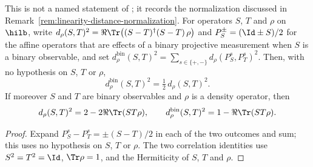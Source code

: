 \begin{lemma}
	\label{lem:binary-measurement-distance}
	\leanok
	This is not a named statement of \cite{Natarajan2017Linearity}; it records
	the normalization discussed in
	Remark~\ref{rem:linearity-distance-normalization}. For operators $S$, $T$
	and $\rho$ on $\hilb$, write
	$d_\rho(S,T)^2 = \Re \Tr\big((S-T)^\dagger (S-T) \, \rho\big)$ and
	$P_S^\pm = (\Id \pm S)/2$ for the affine operators that are effects of a
	binary projective measurement when $S$ is a binary observable, and set
	$d^{\mathrm{bin}}_\rho(S,T)^2
	= \sum_{s \in \{+,-\}} d_\rho(P_S^s, P_T^s)^2$. Then, with no hypothesis
	on $S$, $T$ or $\rho$,
	\[
		d^{\mathrm{bin}}_\rho(S,T)^2 = \tfrac{1}{2} \, d_\rho(S,T)^2 .
	\]
	If moreover $S$ and $T$ are binary observables and $\rho$ is a density
	operator, then
	\[
		d_\rho(S,T)^2 = 2 - 2 \Re \Tr(S T \rho) ,
		\qquad
		d^{\mathrm{bin}}_\rho(S,T)^2 = 1 - \Re \Tr(S T \rho) .
	\]
\end{lemma}
\begin{proof}
	\leanok
	Expand $P_S^s - P_T^s = \pm (S - T)/2$ in each of the two outcomes and
	sum; this uses no hypothesis on $S$, $T$ or $\rho$. The two correlation
	identities use $S^2 = T^2 = \Id$, $\Tr \rho = 1$, and the Hermiticity of
	$S$, $T$ and $\rho$.
\end{proof}

